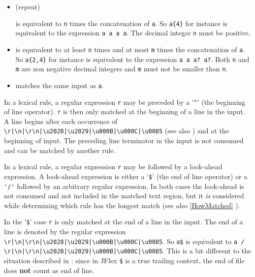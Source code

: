 \documentclass[11pt]{scrartcl}
\newcommand{\bl}{\latex{\symbol{123}}\html{\{}}
\newcommand{\br}{\latex{\symbol{125}}\html{\}}}
\newcommand{\trit}{\em}
\begin{document}
\begin{itemize}
          \item[\texttt{a\bl n\br}] (repeat)          

            is equivalent to \texttt{n} times the concatenation of \texttt{a}.
            So \verb+a{4}+ for instance is equivalent to the expression \texttt{a a a a}.
            The decimal integer \texttt{n} must be positive.          
          
          \item[\texttt{a\bl n,m\br}]          
            is equivalent to at least \texttt{n} times and at most \texttt{m} times the 
            concatenation of \texttt{a}. So \verb+a{2,4}+ for instance is equivalent 
            to the expression \verb+a a a? a?+. Both \texttt{n} and \texttt{m} are non
            negative decimal integers and \texttt{m} must not be smaller than \texttt{n}.
          
          \item[\texttt{( a )}]
            matches the same input as \texttt{a}.
            
        
\end{itemize}
    
In a lexical rule, a regular expression \texttt{r} may be preceded by a
'\verb+^+' (the beginning of line operator). \texttt{r} is then
only matched at the beginning of a line in the input. A line begins
after each occurrence of \verb+\r|\n|\r\n|\u2028|\u2029|\u000B|\u000C|\u0085+ 
(see also \cite{unicode_rep}) and at the beginning of input.  
The preceding line terminator in the input is not consumed and can 
be matched by another rule.

In a lexical rule, a regular expression \texttt{r} may be followed by a
look-ahead expression. A look-ahead expression is either a '\texttt{\$}'
(the end of line operator) or a \verb+'/'+ followed by an arbitrary
regular expression. In both cases the look-ahead is not consumed and
not included in the matched text region, but it {\trit is} considered
while determining which rule has the longest match (see also 
\ref{HowMatched} ). 

In the '\texttt{\$}' case \texttt{r} is only matched at the end of a line in
the input. The end of a line is denoted by the regular expression
\verb+\r|\n|\r\n|\u2028|\u2029|\u000B|\u000C|\u0085+. 
So \verb+a$+ is equivalent to \verb+a / \r|\n|\r\n|\u2028|\u2029|\u000B|\u000C|\u0085+.%
This is a bit different to the situation described in \cite{unicode_rep}:
since in JFlex \verb+$+ is a true trailing context, the end of file
does {\bf not} count as end of line.
\end{document}
